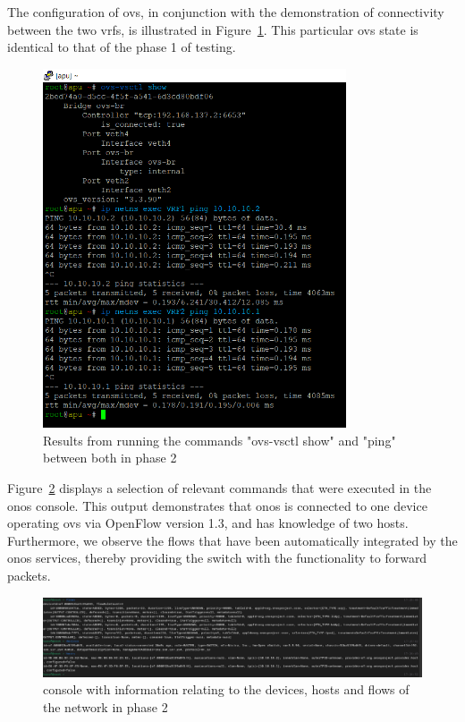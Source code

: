 The configuration of \gls{ovs}, in conjunction with the demonstration of connectivity between the two \glspl{vrf}, is illustrated in Figure~\ref{fig:exp1_phase2_pings}. This particular \gls{ovs} state is identical to that of the phase 1 of testing.

\begin{figure}
	\centering
	\includegraphics[width=0.8\textwidth]{Chapters/Figures/tests/ovs_phase_2/ovs_config_&_pings.PNG}
	\caption{Results from running the commands "ovs-vsctl show" and "ping" between both  in phase 2}
	\label{fig:exp1_phase2_pings}
\end{figure}

Figure~\ref{fig:exp1_phase2_onos} displays a selection of relevant commands that were executed in the \gls{onos} console.
This output demonstrates that \gls{onos} is connected to one device operating \gls{ovs} via OpenFlow version 1.3, and has knowledge of two hosts. Furthermore, we observe the flows that have been automatically integrated by the \gls{onos} services, thereby providing the switch with the functionality to forward packets.

\begin{figure}
	\centering
	\includegraphics[width=\textwidth]{Chapters/Figures/tests/ovs_phase_2/onos_topology_&_more.PNG}
	\caption{ console with information relating to the devices, hosts and flows of the network in phase 2}
	\label{fig:exp1_phase2_onos}
\end{figure}

